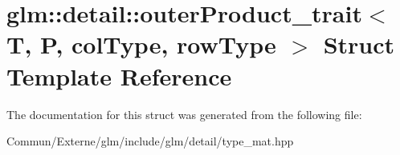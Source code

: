 \hypertarget{structglm_1_1detail_1_1outer_product__trait}{}\section{glm\+:\+:detail\+:\+:outer\+Product\+\_\+trait$<$ T, P, col\+Type, row\+Type $>$ Struct Template Reference}
\label{structglm_1_1detail_1_1outer_product__trait}


The documentation for this struct was generated from the following file\+:\begin{DoxyCompactItemize}
\item 
Commun/\+Externe/glm/include/glm/detail/type\+\_\+mat.\+hpp\end{DoxyCompactItemize}
